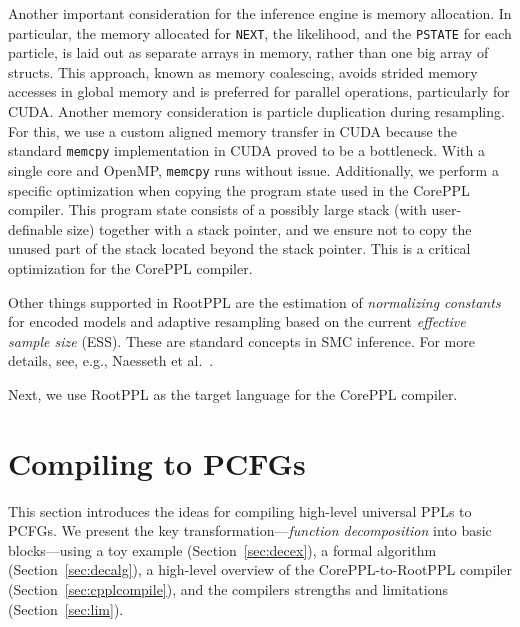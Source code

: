 \documentclass[runningheads]{llncs}
\newcommand{\rlstinline}{\lstinline[language=RootPPL]}
\begin{document}
Another important consideration for the inference engine is memory allocation.
In particular, the memory allocated for \rlstinline!NEXT!, the likelihood, and the \rlstinline!PSTATE! for each particle, is laid out as separate arrays in memory, rather than one big array of structs.
This approach, known as memory coalescing, avoids strided memory accesses in global memory and is preferred for parallel operations, particularly for CUDA.
Another memory consideration is particle duplication during resampling.
For this, we use a custom aligned memory transfer in CUDA because the standard \lstinline!memcpy! implementation in CUDA proved to be a bottleneck.
With a single core and OpenMP, \lstinline!memcpy! runs without issue.
Additionally, we perform a specific optimization when copying the program state used in the CorePPL compiler.
This program state consists of a possibly large stack (with user-definable size) together with a stack pointer, and we ensure not to copy the unused part of the stack located beyond the stack pointer.
This is a critical optimization for the CorePPL compiler.

Other things supported in RootPPL are the estimation of \emph{normalizing constants} for encoded models and adaptive resampling based on the current \emph{effective sample size} (ESS).
These are standard concepts in SMC inference.
For more details, see, e.g., Naesseth et al.~\cite{naesseth2019elements}.

Next, we use RootPPL as the target language for the CorePPL compiler.

\section{Compiling to PCFGs}\label{sec:compiling}
This section introduces the ideas for compiling high-level universal PPLs to PCFGs.
We present the key transformation---\emph{function decomposition} into basic blocks---using a toy example (Section~\ref{sec:decex}), a formal algorithm (Section~\ref{sec:decalg}),
a high-level overview of the CorePPL-to-RootPPL compiler (Section~\ref{sec:cpplcompile}), and the compilers strengths and limitations (Section~\ref{sec:lim}).
\end{document}
